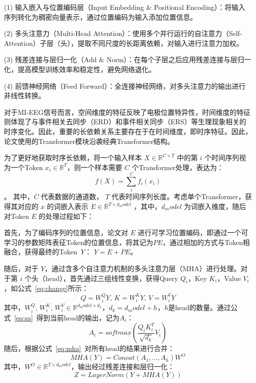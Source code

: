 (1) 输入嵌入与位置编码层（Input Embedding \& Positional Encoding）：将输入序列转化为稠密向量表示，通过位置编码为输入添加位置信息。

(2) 多头注意力（Multi-Head Attention）：使用多个并行运行的自注意力（Self-Attention）子层（头），提取不同尺度的长距离依赖，对输入进行注意力加权。

(3) 残差连接与层归一化（Add \& Norm）：在每个子层之后应用残差连接与层归一化，提高模型训练效率和稳定性，避免网络退化。

(4) 前馈神经网络（Feed Forward）：全连接神经网络，对多头注意力的输出进行非线性转换。

对于MI-EEG信号而言，空间维度的特征反映了电极位置特异性，时间维度的特征则体现了与事件相关去同步（ERD）和事件相关同步（ERS）等生理现象相关的时序变化。因此，重要的长依赖关系主要存在于在时间维度，即时序特征。因此，论文使用的Transformer模块沿袭经典Transformer结构。

为了更好地获取时序长依赖，将一个输入样本 \(X \in \mathbb{R}^{C \times T}\) 中的第 \(i\) 个时间序列视为一个Token \(x_i \in \mathbb{R}^{T}\)，则一个样本需要 \(C\) 个Transformer处理，表达为：
\begin{equation}\label{eq:multi-trans}
    f(X)={\textstyle \sum_{i}^{C}}f_i(x_i)
\end{equation}。
其中，\(C\) 代表数据的通道数， \(T\) 代表时间序列长度。考虑单个Transformer，获得其对应的 \(x\) 的词嵌入表示 \(E \in \mathbb{R}^{T \times d_model}\) ，其中，\(d_model\) 为词嵌入维度，随后对Token \(E\) 的处理过程如下：

首先，为了编码序列的位置信息，论文对 \(E\) 进行可学习位置编码，即通过一个可学习的参数矩阵表征Token的位置信息，将其记为\(PE\)，通过相加的方式与Token相融合，获得最终的Token \,\(Y\)： \(Y=E+PE\)。

随后，对于 \(Y\)，通过含多个自注意力机制的多头注意力层（MHA）进行处理。对于第 \(i\) 个头（head），首先通过三组线性变换，获得Query \(Q_i\)，Key \(K_i\)，Value \(V_i\)，如公式~\ref{eq:change}所示：
\begin{equation}\label{eq:change}
    Q=W^{Q}_iY,\,K=W^{K}_iY,\,V=W^{V}_iY
\end{equation}
其中，\(W^{Q}_i,\,W^{K}_i,\,W^{V}_i \in \mathbb{R}^{d_model \times d_k}\)，\(d_k=d_model \div h\)，\(h\)是head的数量。通过公式~\ref{eq:sa}~得到当前head的输出，记为\(A_i\)：
\begin{equation}\label{eq:sa}
    A_i=softmax(\frac{Q_iK^{T}_i}{\sqrt{d_k}}V_i)
\end{equation}
随后，根据公式~\ref{eq:mha}~对所有head的结果进行合并：
\begin{equation}\label{eq:mha}
    MHA(Y)=Concat(A_1,...,A_h)W^{O}
\end{equation}
其中，\(W^{O} \in \mathbb{R}^{T \times d_model}\)，输出经过残差连接和层归一化：
\begin{equation}\label{eq:rl}
    Z=LayerNorm(Y+MHA(Y))
\end{equation}

